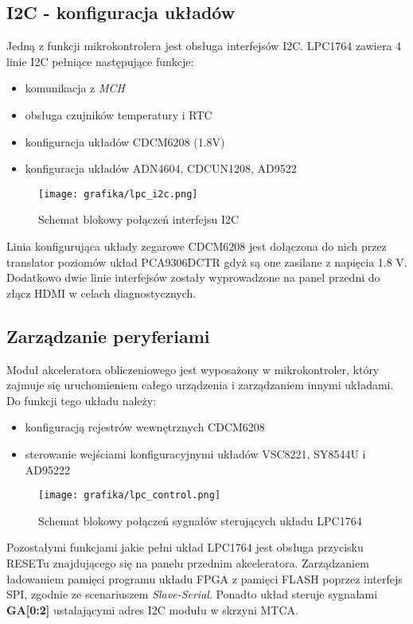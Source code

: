 \subsection{I2C - konfiguracja układów}
Jedną z funkcji mikrokontrolera jest obsługa interfejsów I2C. LPC1764 zawiera 4 linie I2C pełniące następujące funkcje:
\begin{itemize}
\item
komunikacja z \textit{MCH}
\item
obsługa czujników temperatury i RTC
\item
konfiguracja układów CDCM6208 (1.8V)
\item
konfiguracja układów ADN4604, CDCUN1208, AD9522
\end{itemize}


\begin{figure}[!ht]
\centering
\texttt{[image: grafika/lpc\_i2c.png]}
\caption{Schemat blokowy połączeń interfejsu I2C}
\label{I2C_BLOCK}
\end{figure}

Linia konfigurująca układy zegarowe CDCM6208 jest dołączona do nich przez translator poziomów układ PCA9306DCTR \cite{PCA9306DCTR} gdyż są one zasilane z napięcia 1.8 V. Dodatkowo dwie linie interfejsów zostały wyprowadzone na panel przedni do złącz HDMI w celach diagnostycznych. 

\subsection{Zarządzanie peryferiami}
Moduł akceleratora obliczeniowego jest wyposażony w mikrokontroler, który zajmuje się uruchomieniem całego urządzenia i zarządzaniem innymi układami. Do funkcji tego układu należy: 
\begin{itemize} 
\item konfiguracją rejestrów wewnętrznych CDCM6208 
\item sterowanie wejściami konfiguracyjnymi układów VSC8221, SY8544U i AD95222 
\end{itemize}

\begin{figure}[!ht]
\centering
\texttt{[image: grafika/lpc\_control.png]}
\caption{Schemat blokowy połączeń sygnałów sterujących układu LPC1764}
\end{figure}

Pozostałymi funkcjami jakie pełni układ LPC1764 jest obsługa przycisku RESETu znajdującego się na panelu przednim akceleratora. Zarządzaniem ładowaniem pamięci programu układu FPGA z pamięci FLASH poprzez interfejs SPI, zgodnie ze scenariuszem \textit{Slave-Serial}. Ponadto układ steruje sygnałami \textbf{GA[0:2]} ustalającymi adres I2C modułu w skrzyni MTCA. 

